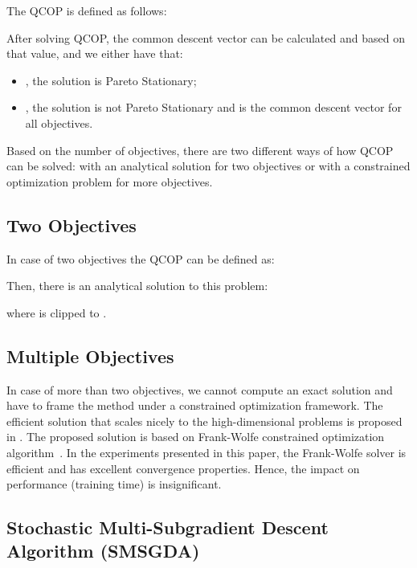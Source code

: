 \documentclass[letterpaper]{article}
\begin{document}
The QCOP is defined as follows:
{}

After solving QCOP, the common descent vector can be calculated and based on that value, and we either have that:
\begin{itemize}
    \item , the solution is Pareto Stationary;
    \item , the solution is not Pareto Stationary and  is the common descent vector for all objectives.
\end{itemize}

Based on the number of objectives, there are two different ways of how QCOP can be solved: with an analytical solution for two objectives or with a constrained optimization problem for more objectives.

\subsection{Two Objectives}

In case of two objectives the QCOP can be defined as:


Then, there is an analytical solution to this problem:


where  is clipped to .

\subsection{Multiple Objectives}

In case of more than two objectives, we cannot compute an exact solution and have to frame the method under a constrained optimization framework. The efficient solution that scales nicely to the high-dimensional problems is proposed in \cite{NIPS2018_7334}. The proposed solution is based on Frank-Wolfe constrained optimization algorithm~\cite{frank1956algorithm}. In the experiments presented in this paper, the Frank-Wolfe solver is efficient and has excellent convergence properties. Hence, the impact on performance (training time) is insignificant.

\subsection{Stochastic Multi-Subgradient Descent Algorithm (SMSGDA)}
\paragraph{}
\end{document}

